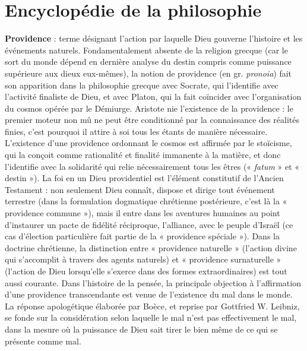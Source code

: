 
\section{Encyclopédie de la philosophie}
%
%
{\bf Providence} : terme désignant l’action par laquelle Dieu gouverne l’histoire et les
événements naturels. Fondamentalement
absente de la religion grecque (car le sort
du monde dépend en dernière analyse du
destin compris comme puissance supérieure aux dieux eux-mêmes), la notion de
providence (en gr. {\it pronoia}) fait son apparition dans la philosophie grecque avec
Socrate, qui l’identifie avec l’activité finaliste de Dieu, et avec Platon, qui la fait
coïncider avec l’organisation du cosmos
opérée par le Démiurge. Aristote nie
l'existence de la providence : le premier
moteur non mû ne peut être conditionné
par la connaissance des réalités finies,
c’est pourquoi il attire à soi tous les étants
de manière nécessaire. L'existence d’une
providence ordonnant le cosmos est affirmée par le stoïcisme, qui la conçoit
comme rationalité et finalité immanente à
la matière, et donc l’identifie avec la solidarité qui relie nécessairement tous les
êtres (« {\it fatum} » et « destin »). La foi en
un Dieu providentiel est l'élément constitutif de l'Ancien Testament : non seulement Dieu connaît, dispose et dirige tout
événement terrestre (dans la formulation
dogmatique chrétienne postérieure, c’est
là la « providence commune »), mais il
entre dans les aventures humaines au
point d'instaurer un pacte de fidélité réciproque, l’alliance, avec le peuple d'Israël
(ce cas d'élection particulière fait partie
de la « providence spéciale »). Dans la
doctrine chrétienne, la distinction entre
« providence naturelle » (l’action divine
qui s’accomplit à travers des agents naturels) et « providence surnaturelle » (l’action de Dieu lorsqu'elle s’exerce dans des
formes extraordinaires) est tout aussi courante. Dans l’histoire de la pensée, la
principale objection à l’affirmation d’une
providence transcendante est venue de
l'existence du mal dans le monde. La
réponse  apologétique élaborée par
Boèce, et reprise par Gottfried W. Leibniz, se fonde sur la considération selon
laquelle le mal n’est pas effectivement le
mal, dans la mesure où la puissance de
Dieu sait tirer le bien même de ce qui se
présente comme mal.



